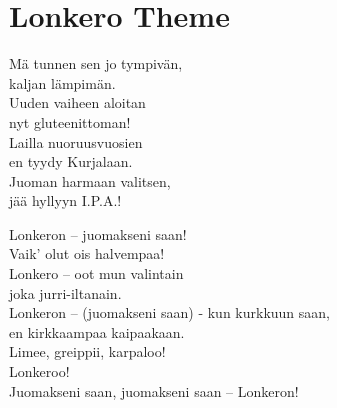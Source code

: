 \section{Lonkero Theme}
Mä tunnen sen jo tympivän,\\
kaljan lämpimän.\\
Uuden vaiheen aloitan\\
nyt gluteenittoman!\\
Lailla nuoruusvuosien\\
en tyydy Kurjalaan.\\
Juoman harmaan valitsen,\\
jää hyllyyn I.P.A.!

Lonkeron – juomakseni saan!\\
Vaik’ olut ois halvempaa!\\
Lonkero – oot mun valintain\\
joka jurri-iltanain.\\
Lonkeron – (juomakseni saan) - kun kurkkuun saan,\\
en kirkkaampaa kaipaakaan.\\
Limee, greippii, karpaloo!\\
Lonkeroo!\\
Juomakseni saan, juomakseni saan – Lonkeron!